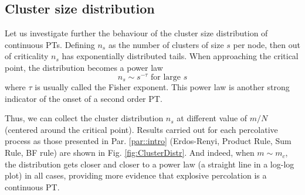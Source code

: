\subsection{Cluster size distribution}
Let us investigate further the behaviour of the cluster size distribution of continuous PTs. Defining $n_s$ as the number of clusters of size $s$ per node, then out of criticality $n_s$ has exponentially distributed tails. When approaching the critical point, the distribution becomes a power law
$$
n_s \sim s^{-\tau}  \mbox{ for large }s 
$$
where $\tau$ is usually called the Fisher exponent. This power law is another strong indicator of the onset of a second order PT.

Thus, we can collect the cluster distribution $n_s$ at different value of $m / N$ (centered around the critical point). Results carried out for each percolative process as those presented in Par. \ref{par::intro} (Erdos-Renyi, Product Rule, Sum Rule, BF rule) are shown in Fig. \ref{fig:ClusterDistr}. And indeed, when $m \sim m_c$, the distribution gets closer and closer to a power law (a straight line in a log-log plot) in all cases, providing more evidence that explosive percolation is a continuous PT.
\label{par:css}
